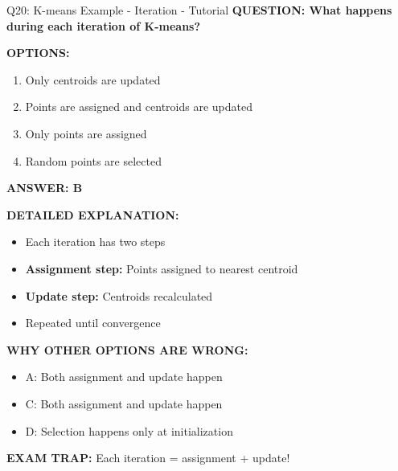 \documentclass[8pt]{beamer}
\begin{document}
	\begin{frame}{Q20: K-means Example - Iteration - Tutorial}
		\fontsize{6.5}{7.5}\selectfont
		\textbf{QUESTION: What happens during each iteration of K-means?}
		
		\vspace{0.1cm}
		\textbf{OPTIONS:}
		\begin{enumerate}
			\item Only centroids are updated
			\item Points are assigned and centroids are updated
			\item Only points are assigned
			\item Random points are selected
		\end{enumerate}
		
		\vspace{0.1cm}
		\textcolor{myblue}{\textbf{ANSWER: B}}
		
		\vspace{0.1cm}
		\textbf{DETAILED EXPLANATION:}
		\begin{itemize}
			\item Each iteration has two steps
			\item \textbf{Assignment step:} Points assigned to nearest centroid
			\item \textbf{Update step:} Centroids recalculated
			\item Repeated until convergence
		\end{itemize}
		
		\vspace{0.1cm}
		\textcolor{myred}{\textbf{WHY OTHER OPTIONS ARE WRONG:}}
		\begin{itemize}
			\item \textcolor{myred}{A:} Both assignment and update happen
			\item \textcolor{myred}{C:} Both assignment and update happen
			\item \textcolor{myred}{D:} Selection happens only at initialization
		\end{itemize}
		
		\textcolor{myred}{\textbf{EXAM TRAP:}} Each iteration = \textcolor{myblue}{assignment + update}!
	\end{frame}
	
\end{document}
